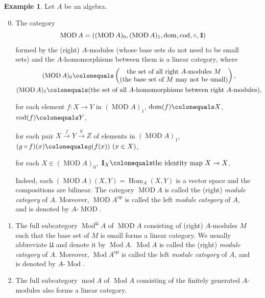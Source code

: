 \documentclass{surv-l}
\numberwithin{equation}{chapter}
\numberwithin{figure}{chapter}
\theoremstyle{plain}
\theoremstyle{definition}
\newtheorem{exm}[thm]{Example}
\theoremstyle{remark}
\newcommand{\id}{1\kern-.25em{\text{{\rm l}}}}
\DeclareMathOperator{\Hom}{Hom}
\DeclareMathOperator{\Mod}{Mod}
\DeclareMathOperator{\MOD}{MOD}
\DeclareMathOperator{\dom}{dom}
\DeclareMathOperator{\cod}{cod}
\begin{document}
\begin{exm}
Let $A$ be an algebra.
\begin{enumerate}
\setcounter{enumi}{-1}
\item
The category
\[
\MOD A=((\MOD A)_0, (\MOD A)_1, \dom, \cod, \circ, \id)
\]
formed by the (right) $A$-modules
(whose base sets do not need to be small sets)
and the $A$-homomorphisms between them
is a linear category, where
\begin{gather*}
(\MOD A)_0\colonequals \left(\begin{matrix} \text{the set of all right $A$-modules $M$}\\
\text{(the base set of $M$ may not be small)} \end{matrix}\right),\\
(\MOD A)_1\colonequals (\text{the set of all $A$-homomorphisms between right
  $A$-modules}),
\end{gather*}

for each element $f\colon X \to Y$ in $(\MOD A)_1$, $\dom(f)\colonequals X$,
$\cod(f)\colonequals Y$,

for each pair $X \xrightarrow{f}Y \xrightarrow{g}Z$ of elements in $(\MOD A)_1$,
$(g\circ f)(x)\colonequals g(f(x))\ (x \in X)$,

for each $X \in (\MOD A)_0$, $\id_X\colonequals \text{the identity map }X \to X$.

Indeed, each $(\MOD A)(X, Y)=\Hom_A(X, Y)$ is a vector space and the compositions are
bilinear.
The category $\MOD A$ is called the (right) \emph{module category} of $A$.
Moreover, $\MOD A^{\mathrm{op}}$ is called the left \emph{module category} of $A$, and is
denoted by $A\text{-}\MOD$.

\item
The full subcategory $\Mod^\mathfrak{U} A$ of $\MOD A$ consisting of
(right) $A$-modules $M$ such that the base set of $M$ is small
forms a linear category.
We usually abbreviate $\mathfrak{U}$ and denote it by $\Mod A$.
$\Mod A$ is called the (right) \emph{module category} of $A$.
Moreover, $\Mod A^{\mathrm{op}}$ is called the left \emph{module category} of $A$,
and is denoted by $A\text{-}\Mod$.

\item
The full subcategory $\operatorname{mod}  A$ of $\Mod A$ consisting of the finitely generated $A$-modules
also forms a linear category.
\end{enumerate}
\end{exm}
\end{document}

